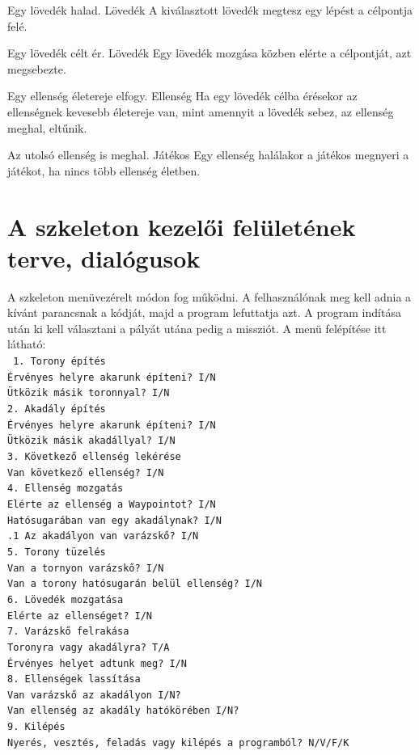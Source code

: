 {Egy lövedék halad.}
{Lövedék}
{A kiválasztott lövedék megtesz egy lépést a célpontja felé.}

{Egy lövedék célt ér.}
{Lövedék}
{Egy lövedék mozgása közben elérte a célpontját, azt megsebezte.}

{Egy ellenség életereje elfogy.}
{Ellenség}
{Ha egy lövedék célba érésekor az ellenségnek kevesebb életereje van, mint amennyit a lövedék sebez, az ellenség meghal, eltűnik.}

{Az utolsó ellenség is meghal.}
{Játékos}
{Egy ellenség halálakor a játékos megnyeri a játékot, ha nincs több ellenség életben.}

\pagebreak
\setlength\parindent{15mm}
\section{A szkeleton kezelői felületének terve, dialógusok}
A szkeleton menüvezérelt módon fog működni. A felhasználónak meg kell adnia a kívánt parancsnak a kódját, majd a program lefuttatja azt. A program indítása után ki kell választani a pályát utána pedig a missziót. A menü felépítése itt látható: \\
\begingroup 
\fontsize{10pt}{10pt}\selectfont
\texttt{
1. Torony építés \\
 Érvényes helyre akarunk építeni? I/N \\
 Ütközik másik toronnyal? I/N \\
2. Akadály építés \\
 Érvényes helyre akarunk építeni? I/N \\
 Ütközik másik akadállyal? I/N \\
3. Következő ellenség lekérése \\
 Van következő ellenség? I/N \\
4. Ellenség mozgatás \\
 Elérte az ellenség a Waypointot? I/N \\
 Hatósugarában van egy akadálynak? I/N \\
\indent {}.1 Az akadályon van varázskő? I/N \\
5. Torony tüzelés \\
 Van a tornyon varázskő? I/N \\
 Van a torony hatósugarán belül ellenség? I/N \\
6. Lövedék mozgatása \\
 Elérte az ellenséget? I/N \\
7. Varázskő felrakása \\
 Toronyra vagy akadályra? T/A \\
 Érvényes helyet adtunk meg? I/N \\
8. Ellenségek lassítása \\
 Van varázskő az akadályon I/N? \\
 Van ellenség az akadály hatókörében I/N? \\
9. Kilépés \\
 Nyerés, vesztés, feladás vagy kilépés a programból? N/V/F/K \\
}
